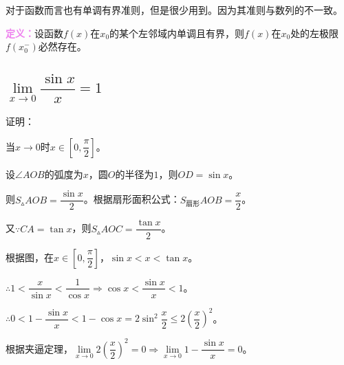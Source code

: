 \documentclass[UTF8, 12pt]{ctexart}
\begin{document}
        对于函数而言也有单调有界准则，但是很少用到。因为其准则与数列的不一致。

        \textcolor{violet}{\textbf{定义：}}设函数$f(x)$在$x_0$的某个左邻域内单调且有界，则$f(x)$在$x_0$处的左极限$f(x_0^-)$必然存在。

        \subsection{\texorpdfstring{$\lim\limits_{x\to 0}\dfrac{\sin x}{x}=1$}{}}

        证明：

        \begin{minipage}{0.7\linewidth}
            当$x\to 0$时$x\in[0,\dfrac{\pi}{2}]$。

            设$\angle AOB$的弧度为$x$，圆$O$的半径为$1$，则$OD=\sin x$。

            则$S_\vartriangle AOB=\dfrac{\sin x}{2}$。根据扇形面积公式：$S_{\text{扇形}}AOB=\dfrac{x}{2}$。

            又$\because CA=\tan x$，则$S_\vartriangle AOC=\dfrac{\tan x}{2}$。
        \end{minipage}
        \hfill
        \begin{minipage}{0.2\linewidth}
        \end{minipage}

        根据图，在$x\in[0,\dfrac{\pi}{2}]$，$\sin x<x<\tan x$。

        $\therefore 1<\dfrac{x}{\sin x}<\dfrac{1}{\cos x}\Rightarrow\cos x<\dfrac{\sin x}{x}<1$。

        $\therefore 0<1-\dfrac{\sin x}{x}<1-\cos x=2\sin^2\dfrac{x}{2}\leqslant 2\left(\dfrac{x}{2}\right)^2$。

        根据夹逼定理，$\lim\limits_{x\to 0}2\left(\dfrac{x}{2}\right)^2=0\Rightarrow\lim\limits_{x\to 0}1-\dfrac{\sin x}{x}=0$。
\end{document}
